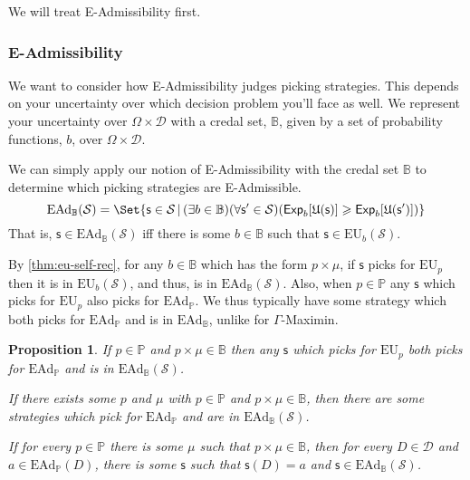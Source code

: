 \documentclass[a4paper]{article}
\newtheorem{proposition}[theorem]{Proposition}
\newtheorem{lemma}[theorem]{Lemma}
\renewcommand\P{\mathbb{P}} %
\newcommand\Exp{\mathsf{Exp}}
\newcommand\EU{\mathrm{EU}}
\newcommand\EAd{\mathrm{EAd}}
\newcommand\U{\mathfrak{U}} %
\newcommand{\D}{\mathcal{D}}
\newcommand{\Decs}{\mathcal{D}}
\renewcommand\S{\mathcal{S}}
\newcommand\s{\mathsf{s}}
\newcommand{\IB}{\mathbb{B}}
\newcommand{\IP}{\P}
\renewcommand{\color}[1]{}
\newenvironment{colored}[1]{\leavevmode\color{#1}}{}
\newcommand\SetDelimiter[1][]{
	\nonscript\,#1\vert \allowbreak \nonscript\,\mathopen{}}
\providecommand\given{\SetDelimiter}
\renewcommand{\geq}{\geqslant}
\newenvironment{CCM rewritten}
{\begingroup\color{blue}} %
{\endgroup}              %
\begin{document}
We will treat E-Admissibility first. 
\begin{colored}{violet}
	
\subsubsection{E-Admissibility}

 
We want to consider how E-Admissibility judges picking strategies.  
This depends on your uncertainty over which decision problem you'll face as well. 
We represent your uncertainty over $\Omega \times \D$ with a credal set, $\IB$, given by a set of probability functions, $b$, over $\Omega\times \D$. 

We can simply apply our notion of E-Admissibility with the credal set $\IB$ to determine which picking strategies are E-Admissible. 
 $$\EAd_\IB(\S)=\Set{\s\in\S\given  (\exists b \in \IB)(\forall \s' \in \S)(\Exp_b[\U(\s)]\geq\Exp_b[\U(\s')])}$$
That is, $\s\in\EAd_\IB(\S)$ iff there is some $b\in\IB$ such that $\s\in\EU_b(\S)$. 
%	


By \cref{thm:eu-self-rec}, for any $b\in\IB$ which has the form $p\times\mu$, if $\s$ picks for $\EU_p$ then it is in $\EU_{b}(\S)$, and thus, is in $\EAd_\IB(\S)$. Also, when $p\in\IP$ any $\s$ which picks for $\EU_p$ also picks for $\EAd_\IP$. We thus typically have some strategy which both picks for $\EAd_\IP$ and is in $\EAd_\IB$, unlike for $\Gamma$-Maximin. 
 \begin{proposition}\label{thm:ead-existence[indep]}
	If $p\in\IP$ and $p\times\mu\in\IB$ then any $\s$ which picks for $\EU_p$ both picks for $\EAd_\IP$ and is in $\EAd_\IB(\S)$. 
	
	If there exists some $p$ and $\mu$ with $p\in\IP$ and $p\times\mu\in\IB$, then there are some strategies which pick for $\EAd_\IP$ and are in $\EAd_\IB(\S)$. 
	
	If for every $p\in\IP$ there is some $\mu$ such that $p\times\mu\in\IB$, then for every $D\in\Decs$ and $a\in\EAd_\IP(D)$, there is some $\s$ such that $\s(D)=a$ and $\s\in\EAd_\IB(\S)$. 
\end{proposition}



\end{colored}
\end{document}
